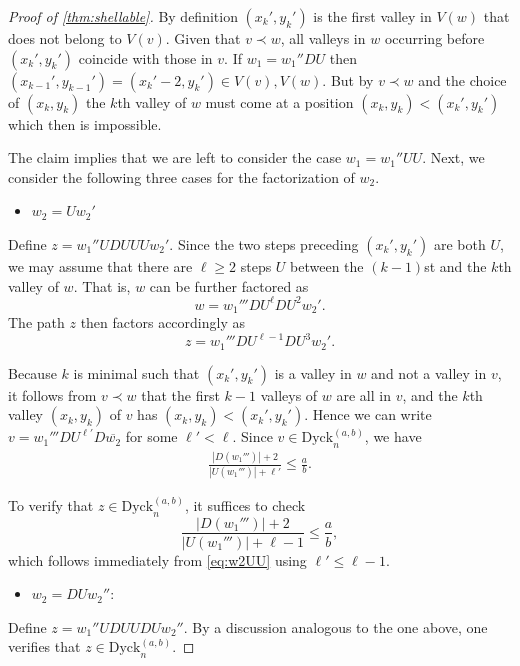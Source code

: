\documentclass[11pt]{amsart}
\def\Dyck{\mathrm{Dyck}}
\theoremstyle{plain}
\numberwithin{lemma}{\DefaultNumberTheoremWithin}
\numberwithin{theorem}{\DefaultNumberTheoremWithin}
\numberwithin{corollary}{\DefaultNumberTheoremWithin}
\numberwithin{proposition}{\DefaultNumberTheoremWithin}
\numberwithin{conjecture}{\DefaultNumberTheoremWithin}
\theoremstyle{definition}
\numberwithin{definition}{\DefaultNumberTheoremWithin}
\numberwithin{question}{\DefaultNumberTheoremWithin}
\numberwithin{problem}{\DefaultNumberTheoremWithin}
\theoremstyle{remark}
\numberwithin{remark}{\DefaultNumberTheoremWithin}
\numberwithin{example}{\DefaultNumberTheoremWithin}
\numberwithin{claim}{\DefaultNumberTheoremWithin}
\begin{document}
\begin{proof}[Proof of \ref{thm:shellable}]
 \smallskip 
 
 By definition $(x_k',y_k')$ is the first valley in $V(w)$ that does not belong to $V(v)$. 
 Given that $v \prec w$, all valleys in $w$ occurring before $(x_k',y_k')$ coincide with those in $v$. If $w_1=w_1''DU$ then $(x_{k-1}',y_{k-1}') = (x_k'-2,y_k') \in V(v),V(w)$. 
 But by $v \prec w$ and the choice of $(x_k,y_k)$ the $k$th valley of $w$ must come at a position 
 $(x_k,y_k) < (x_k',y_k')$ which then is impossible.

 \medskip
 
 The claim implies that we are left to consider the case $w_1 = w_1''UU$. 
    Next, we consider the following three cases for the factorization of $w_2$. 
    
\medskip

\begin{itemize}
    \item[$\longrightarrow$] $w_2 = U  w_2'$ 
\end{itemize}
 Define $z = w_1'' U D U U U w_2'$.
Since the two steps preceding $(x_k',y_k')$ are both $U$, we may assume  that there are $\ell \geq 2$ steps $U$ between the $(k-1)$st and the $k$th 
valley of $w$. That is, $w$ can be further factored as
\[
w = w_1''' D U^\ell  D  U^2  w_2'.
\]
The  path $z$ then factors accordingly as 
\[
z = w_1''' D U^{\ell-1}  D  U^3  w_2'.
\]

Because $k$ is minimal such that $(x_k',y_k')$ is a valley in $w$ and not a valley in $v$, it follows from $v \prec w$ that the first $k-1$ valleys of $w$ are all in $v$, and the $k$th valley $(x_k,y_k)$ of $v$ has $(x_k,y_k) < (x_k',y_k')$. Hence we can write $v = w_1''' D U^{\ell'}  D  \overline{w_2}$ for some $\ell' < \ell$. Since $v \in \Dyck^{(a,b)}_n$, we have
\begin{align} \label{eq:w2UU}
\frac{|D(w_1''')| + 2}{|U(w_1''')| + \ell'} \le \frac{a}{b}.
\end{align}

To verify that $z \in \Dyck^{(a,b)}_n$, it suffices to check
\[
\frac{|D(w_1''')| + 2}{|U(w_1''')| + \ell - 1} \le \frac{a}{b},
\]
which follows immediately from \eqref{eq:w2UU} using $\ell' \le \ell - 1$.

    \medskip
    
    \begin{itemize}
        \item[$\longrightarrow$]  $w_2 = DU w_2''$:
  \end{itemize}
        
        Define $z = w_1'' U D U UDU w_2''$. By a discussion analogous to the one above, one verifies that $z \in \Dyck^{(a,b)}_n$.
  

\end{proof}
\end{document}
